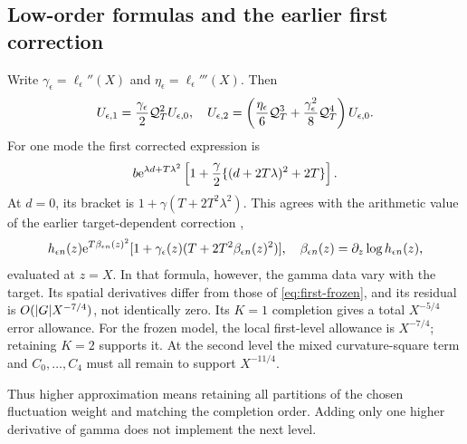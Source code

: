 \subsection{Low-order formulas and the earlier first correction}
\label{subsec:low-orders}
Write \(\gamma_\epsilon=\ell_\epsilon''(X)\) and
\(\eta_\epsilon=\ell_\epsilon'''(X)\). Then
\[
 U_{\epsilon,1}=\frac{\gamma_\epsilon}{2}\mathcal Q_T^2U_{\epsilon,0},
 \quad
 U_{\epsilon,2}=\left(\frac{\eta_\epsilon}{6}\mathcal Q_T^3+
             \frac{\gamma_\epsilon^2}{8}\mathcal Q_T^4\right)U_{\epsilon,0}.
\]
For one mode the first corrected expression is
\begin{equation}
 b\mathrm e^{\lambda d+T\lambda^2}
       \left[1+\frac{\gamma}{2}\{(d+2T\lambda)^2+2T\}\right].
 \label{eq:first-frozen}
\end{equation}
At \(d=0\), its bracket is
\(1+\gamma(T+2T^2\lambda^2)\).
This agrees with the arithmetic value of the earlier
target-dependent correction \cite{ans10},
\[
 h_{\epsilon n}(z)\mathrm e^{T\beta_{\epsilon n}(z)^2}
    [1+\gamma_\epsilon(z)(T+2T^2\beta_{\epsilon n}(z)^2)],
 \quad
 \beta_{\epsilon n}(z)=\partial_z\log h_{\epsilon n}(z),
\]
evaluated at \(z=X\). In that formula, however, the gamma data
vary with the target. Its spatial derivatives differ from those
of \eqref{eq:first-frozen}, and its residual is
\(O(\lvert G\rvert X^{-7/4})\), not identically zero.
Its \(K=1\) completion gives a total \(X^{-5/4}\) error allowance.
For the frozen model, the local first-level allowance is
\(X^{-7/4}\); retaining \(K=2\) supports it. At the second level
the mixed curvature-square term and \(C_0,\ldots,C_4\) must all
remain to support \(X^{-11/4}\).

Thus higher approximation means retaining all partitions of the
chosen fluctuation weight and matching the completion order.
Adding only one higher derivative of gamma does not implement
the next level.
